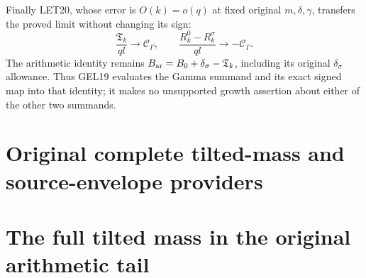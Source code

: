 Finally LET20, whose error is \(O(k)=o(q)\) at fixed original
\(m,\delta,\gamma\), transfers the proved limit without changing its sign:
\[
 \frac{\mathfrak T_k}{ql}\longrightarrow\mathcal C_\Gamma,
 \qquad
 \frac{R_k^0-R_k^\sigma}{ql}\longrightarrow-\mathcal C_\Gamma.
 \tag{GEL19}
\]
The arithmetic identity remains
\(B_{\rm ar}=B_0+\delta_\sigma-\mathfrak T_k\), including its original
\(\delta_\sigma\) allowance. Thus GEL19 evaluates the Gamma summand
and its exact signed map into that identity; it makes no unsupported
growth assertion about either of the other two summands.




\endgroup

\clearpage
\begingroup


\setcounter{equation}{0}
\renewcommand{\theequation}{RTM.\arabic{equation}}
\section*{Original complete tilted-mass and source-envelope providers}
\section{The full tilted mass in the original arithmetic tail}
\label{rtm:sec:retained-tilted-mass-tail}

